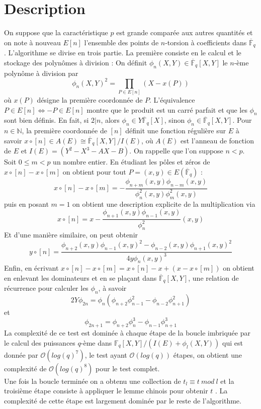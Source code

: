\documentclass{article}
\theoremstyle{definition}
\theoremstyle{plain}
\begin{document}
\section{Description}
\indent \indent On suppose que la caractéristique $p$ est grande comparée aux autres quantités et on note à nouveau $E[n]$ l'ensemble des points de $n$-torsion à coefficients dans $\overline{\mathbb{F}}_q$. L'algorithme se divise en trois partie. La première consiste en le calcul et le stockage des polynômes à division : On définit $\phi_n(X,Y)\in \overline{\mathbb{F}}_q[X,Y]$ le $n$-ème polynôme à division par $$\phi_n(X,Y)^2=\prod_{P\in E[n]}(X-x(P))$$
où $x(P)$ désigne la première coordonnée de $P$. L'équivalence $P\in E[n]\Leftrightarrow -P\in E[n]$ montre que le produit est un carré parfait et que les $\phi_n$ sont bien définis. En fait, si $2|n$, alors $\phi_n\in Y\overline{\mathbb{F}}_q[X]$, sinon $\phi_n\in\overline{\mathbb{F}}_q[X,Y]$. Pour $n\in\mathbb{N}$, la première coordonnée de $[n]$ définit une fonction régulière sur $E$ à savoir $x\circ[n]\in A(E)\cong \overline{\mathbb{F}}_q[X,Y]/I(E)$, où $A(E)$ est l'anneau de fonction de $E$ et $I(E)=(Y^2-X^3-AX-B)$. On rappelle que l'on suppose $n<p$. Soit $0\leq m<p$ un nombre entier. En étudiant les pôles et zéros de $x\circ [n]-x\circ[m]$ on obtient pour tout $P=(x,y)\in E(\overline{\mathbb{F}}_q)$ : $$x\circ [n]-x\circ[m]=-\frac{\phi_{n+m}(x,y)\phi_{n-m}(x,y)}{\phi_n^2(x,y)\phi_m^2(x,y)}$$ puis en posant $m=1$ on obtient une description explicite de la multiplication via $$x\circ [n]=x-\frac{\phi_{n+1}(x,y)\phi_{n-1}(x,y)}{\phi_n^2}(x,y)$$ Et d'une manière similaire, on peut obtenir $$y\circ [n]=\frac{\phi_{n+2}(x,y)\phi_{n-1}(x,y)^2-\phi_{n-2}(x,y)\phi_{n+1}(x,y)^2}{4y\phi_n(x,y)^3}$$ Enfin, en écrivant $x\circ [n]-x\circ [m]=x\circ [n]-x+(x-x\circ [m])$ on obtient en enlevant les dominateurs et en se plaçant dans $\overline{\mathbb{F}}_q[X,Y]$, une relation de récurrence pour calculer les $\phi_n$, à savoir $$2Y\phi_{2n}=\phi_n(\phi_{n+2}\phi_{n-1}^2-\phi_{n-2}\phi_{n+1}^2)$$
et $$\phi_{2n+1}=\phi_{n+2}\phi_n^3-\phi_{n-1}\phi_{n+1}^3$$
La complexité de ce test est dominée à chaque étape de la boucle imbriquée par le calcul des puissances $q$-ème dans $\mathbb{F}_q[X,Y]/(I(E)+\phi_l(X,Y))$ qui est donnée par $\mathcal{O}(log(q)^7)$, le test ayant $\mathcal{O}(log(q))$ étapes, on obtient une complexité de $\mathcal{O}(log(q)^8)$ pour le test complet.\\ \indent Une fois la boucle terminée on a obtenu une collection de $t_l\equiv t~mod~l$ et la troisième étape consiste à appliquer le lemme chinois pour obtenir $t$ . La complexité de cette étape est largement dominée par le reste de l'algorithme. 
\end{document}
